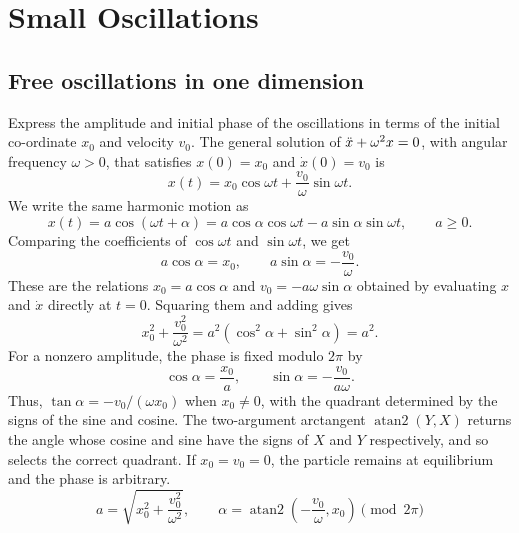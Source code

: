 \chapter{Small Oscillations}

\section{Free oscillations in one dimension}


\begin{problem}[title={Amplitude and phase from initial conditions}]
{
Express the amplitude and initial phase of the oscillations in terms of the initial co-ordinate $x_0$ and velocity $v_0$.
}
{
The general solution of $\Ddot{x} + \omega^2x = 0$, with angular frequency $\omega > 0$, that satisfies $x(0) = x_0$ and $\Dot{x}(0) = v_0$ is
\begin{equation*}
    x(t) = x_0\cos{\omega t} + \frac{v_0}{\omega}\sin{\omega t}.
\end{equation*}
We write the same harmonic motion as
\begin{equation*}
    x(t) = a\cos{(\omega t + \alpha)} = a\cos{\alpha}\cos{\omega t} - a\sin{\alpha}\sin{\omega t}, \qquad a \geq 0.
\end{equation*}
Comparing the coefficients of $\cos{\omega t}$ and $\sin{\omega t}$, we get
\begin{equation*}
    a\cos{\alpha} = x_0, \qquad a\sin{\alpha} = -\frac{v_0}{\omega}.
\end{equation*}
These are the relations $x_0 = a\cos{\alpha}$ and $v_0 = -a\omega\sin{\alpha}$ obtained by evaluating $x$ and $\Dot{x}$ directly at $t = 0$. Squaring them and adding gives
\begin{equation*}
    x_0^2 + \frac{v_0^2}{\omega^2} = a^2\left(\cos^2{\alpha} + \sin^2{\alpha}\right) = a^2.
\end{equation*}
For a nonzero amplitude, the phase is fixed modulo $2\pi$ by
\begin{equation*}
    \cos{\alpha} = \frac{x_0}{a}, \qquad \sin{\alpha} = -\frac{v_0}{a\omega}.
\end{equation*}
Thus, $\tan{\alpha} = -v_0/(\omega x_0)$ when $x_0 \neq 0$, with the quadrant determined by the signs of the sine and cosine. The two-argument arctangent $\operatorname{atan2}(Y, X)$ returns the angle whose cosine and sine have the signs of $X$ and $Y$ respectively, and so selects the correct quadrant. If $x_0 = v_0 = 0$, the particle remains at equilibrium and the phase is arbitrary.
}
{
\begin{equation*}
    a = \sqrt{x_0^2 + \frac{v_0^2}{\omega^2}}, \qquad \alpha = \operatorname{atan2}\left(-\frac{v_0}{\omega}, x_0\right) \pmod{2\pi}
\end{equation*}
}
\end{problem}

